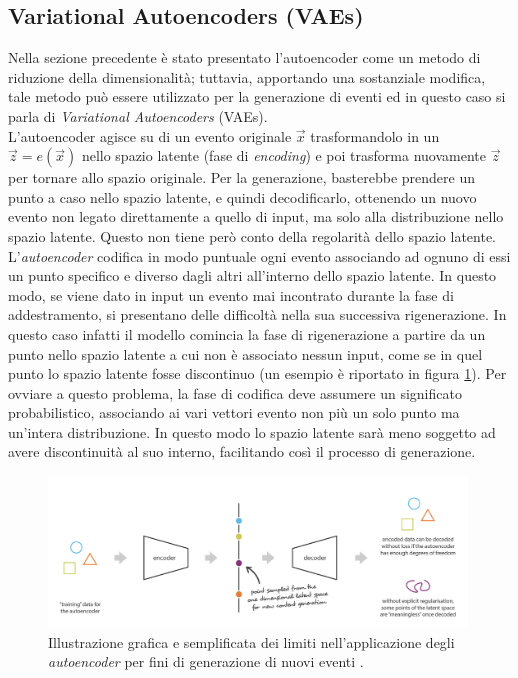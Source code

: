 
\subsection{Variational Autoencoders (VAEs)}
\label{VAEs}

Nella sezione precedente è stato presentato l'autoencoder come un metodo di riduzione della dimensionalità; tuttavia, apportando una sostanziale modifica, tale metodo può essere utilizzato per la generazione di eventi ed in questo caso si parla di \textit{Variational Autoencoders} (VAEs). \\ 
L'autoencoder agisce su di un evento originale $\vec{x}$ trasformandolo in un $\vec{z} = e(\vec{x})$ nello spazio latente (fase di \textit{encoding}) e poi trasforma nuovamente $\vec{z}$ per tornare allo spazio originale. Per la generazione, basterebbe prendere un punto a caso nello spazio latente, e quindi decodificarlo, ottenendo un nuovo evento non legato direttamente a quello di input, ma solo alla distribuzione nello spazio latente. Questo non tiene però conto della regolarità dello spazio latente.\\ 
L'\textit{autoencoder} codifica in modo puntuale ogni evento associando ad ognuno di essi un punto specifico e diverso dagli altri all'interno dello spazio latente. In questo modo, se viene dato in input un evento mai incontrato durante la fase di addestramento, si presentano delle difficoltà nella sua successiva rigenerazione. In questo caso infatti il modello comincia la fase di rigenerazione a partire da un punto nello spazio latente a cui non è associato nessun input, come se in quel punto lo spazio latente fosse discontinuo (un esempio è riportato in figura \ref{limite autoencoder}). Per ovviare a questo problema, la fase di codifica deve assumere un significato probabilistico, associando ai vari vettori evento non più un solo punto ma un'intera distribuzione. In questo modo lo spazio latente sarà meno soggetto ad avere discontinuità al suo interno, facilitando così il processo di generazione.

\begin{figure}[h!]
	\centering
	\includegraphics[width=0.99\textwidth]{figs/limite_autoencoder.png}
	\caption{Illustrazione grafica e semplificata dei limiti nell'applicazione degli \textit{autoencoder} per fini di generazione di nuovi eventi \cite{Understanding_VAEs}.}
	\label{limite autoencoder}
\end{figure}
 

